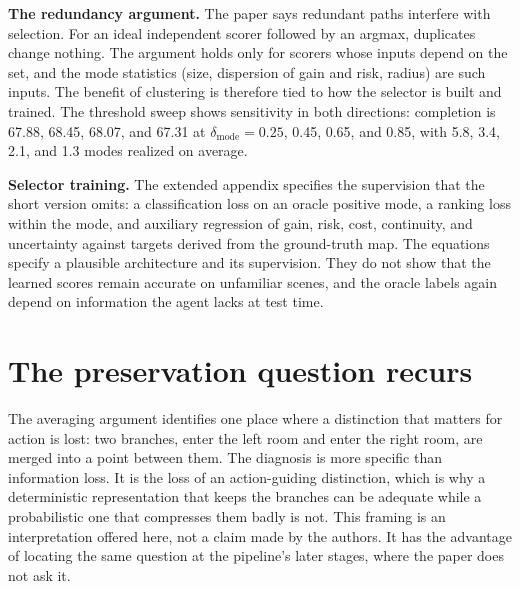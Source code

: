 \documentclass[11pt]{article}
\theoremstyle{plain}
\theoremstyle{remark}
\begin{document}
\textbf{The redundancy argument.} The paper says redundant paths interfere with selection. For an ideal independent scorer followed by an argmax, duplicates change nothing. The argument holds only for scorers whose inputs depend on the set, and the mode statistics (size, dispersion of gain and risk, radius) are such inputs. The benefit of clustering is therefore tied to how the selector is built and trained. The threshold sweep shows sensitivity in both directions: completion is 67.88, 68.45, 68.07, and 67.31 at $\delta_{\mathrm{mode}}=0.25$, 0.45, 0.65, and 0.85, with 5.8, 3.4, 2.1, and 1.3 modes realized on average.

\textbf{Selector training.} The extended appendix specifies the supervision that the short version omits: a classification loss on an oracle positive mode, a ranking loss within the mode, and auxiliary regression of gain, risk, cost, continuity, and uncertainty against targets derived from the ground-truth map. The equations specify a plausible architecture and its supervision. They do not show that the learned scores remain accurate on unfamiliar scenes, and the oracle labels again depend on information the agent lacks at test time.

\section{The preservation question recurs}\label{sec:preserve}

The averaging argument identifies one place where a distinction that matters for action is lost: two branches, enter the left room and enter the right room, are merged into a point between them. The diagnosis is more specific than information loss. It is the loss of an action-guiding distinction, which is why a deterministic representation that keeps the branches can be adequate while a probabilistic one that compresses them badly is not. This framing is an interpretation offered here, not a claim made by the authors. It has the advantage of locating the same question at the pipeline's later stages, where the paper does not ask it.
\end{document}
